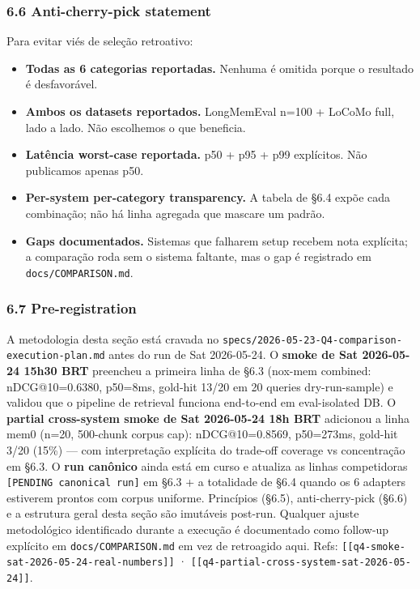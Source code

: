 \documentclass[
]{article}
\providecommand{\tightlist}{%
  \setlength{\itemsep}{0pt}\setlength{\parskip}{0pt}}
\begin{document}
\subsubsection{6.6 Anti-cherry-pick
statement}\label{anti-cherry-pick-statement}

Para evitar viés de seleção retroativo:

\begin{itemize}
\tightlist
\item
  \textbf{Todas as 6 categorias reportadas.} Nenhuma é omitida porque o
  resultado é desfavorável.
\item
  \textbf{Ambos os datasets reportados.} LongMemEval n=100 + LoCoMo
  full, lado a lado. Não escolhemos o que beneficia.
\item
  \textbf{Latência worst-case reportada.} p50 + p95 + p99 explícitos.
  Não publicamos apenas p50.
\item
  \textbf{Per-system per-category transparency.} A tabela de §6.4 expõe
  cada combinação; não há linha agregada que mascare um padrão.
\item
  \textbf{Gaps documentados.} Sistemas que falharem setup recebem nota
  explícita; a comparação roda sem o sistema faltante, mas o gap é
  registrado em \texttt{docs/COMPARISON.md}.
\end{itemize}

\subsubsection{6.7 Pre-registration}\label{pre-registration}

A metodologia desta seção está cravada no
\texttt{specs/2026-05-23-Q4-comparison-execution-plan.md} antes do run
de Sat 2026-05-24. O \textbf{smoke de Sat 2026-05-24 15h30 BRT}
preencheu a primeira linha de §6.3 (nox-mem combined: nDCG@10=0.6380,
p50=8ms, gold-hit 13/20 em 20 queries dry-run-sample) e validou que o
pipeline de retrieval funciona end-to-end em eval-isolated DB. O
\textbf{partial cross-system smoke de Sat 2026-05-24 18h BRT} adicionou
a linha mem0 (n=20, 500-chunk corpus cap): nDCG@10=0.8569, p50=273ms,
gold-hit 3/20 (15\%) --- com interpretação explícita do trade-off
coverage vs concentração em §6.3. O \textbf{run canônico} ainda está em
curso e atualiza as linhas competidoras
\texttt{{[}PENDING\ canonical\ run{]}} em §6.3 + a totalidade de §6.4
quando os 6 adapters estiverem prontos com corpus uniforme. Princípios
(§6.5), anti-cherry-pick (§6.6) e a estrutura geral desta seção são
imutáveis post-run. Qualquer ajuste metodológico identificado durante a
execução é documentado como follow-up explícito em
\texttt{docs/COMPARISON.md} em vez de retroagido aqui. Refs:
\texttt{{[}{[}q4-smoke-sat-2026-05-24-real-numbers{]}{]}} ·
\texttt{{[}{[}q4-partial-cross-system-sat-2026-05-24{]}{]}}.
\end{document}
